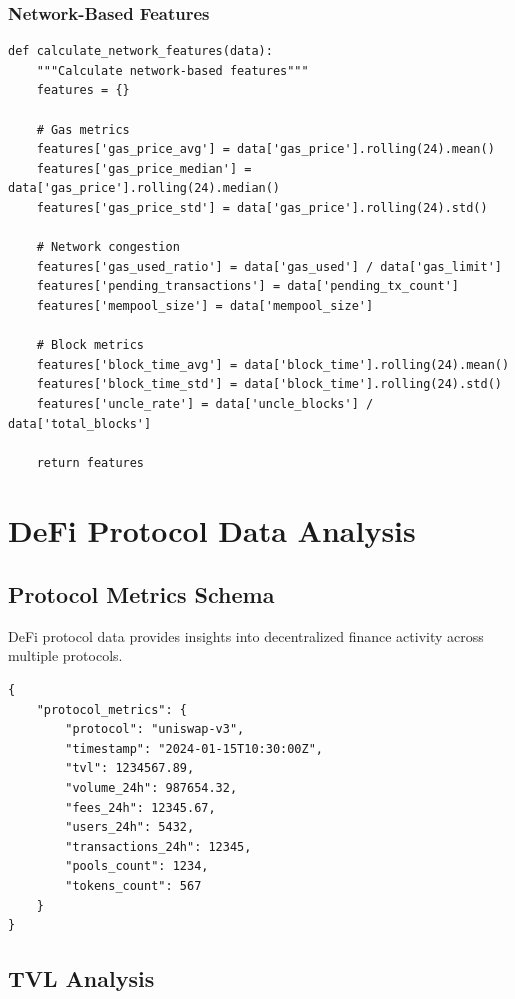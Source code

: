\documentclass[12pt,a4paper]{article}
\begin{document}
\subsubsection{Network-Based Features}

\begin{lstlisting}
def calculate_network_features(data):
    """Calculate network-based features"""
    features = {}
    
    # Gas metrics
    features['gas_price_avg'] = data['gas_price'].rolling(24).mean()
    features['gas_price_median'] = data['gas_price'].rolling(24).median()
    features['gas_price_std'] = data['gas_price'].rolling(24).std()
    
    # Network congestion
    features['gas_used_ratio'] = data['gas_used'] / data['gas_limit']
    features['pending_transactions'] = data['pending_tx_count']
    features['mempool_size'] = data['mempool_size']
    
    # Block metrics
    features['block_time_avg'] = data['block_time'].rolling(24).mean()
    features['block_time_std'] = data['block_time'].rolling(24).std()
    features['uncle_rate'] = data['uncle_blocks'] / data['total_blocks']
    
    return features
\end{lstlisting}

\section{DeFi Protocol Data Analysis}

\subsection{Protocol Metrics Schema}

DeFi protocol data provides insights into decentralized finance activity across multiple protocols.

\begin{lstlisting}
{
    "protocol_metrics": {
        "protocol": "uniswap-v3",
        "timestamp": "2024-01-15T10:30:00Z",
        "tvl": 1234567.89,
        "volume_24h": 987654.32,
        "fees_24h": 12345.67,
        "users_24h": 5432,
        "transactions_24h": 12345,
        "pools_count": 1234,
        "tokens_count": 567
    }
}
\end{lstlisting}

\subsection{TVL Analysis}
\end{document}
